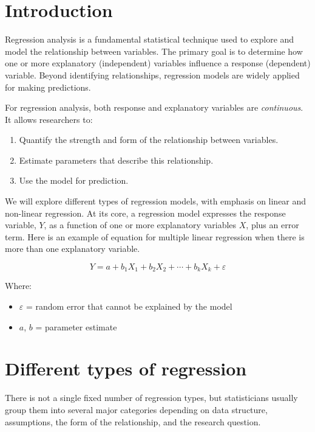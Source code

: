 \documentclass[
]{book}
\providecommand{\tightlist}{%
  \setlength{\itemsep}{0pt}\setlength{\parskip}{0pt}}
\begin{document}
\section{Introduction}\label{introduction-9}

Regression analysis is a fundamental statistical technique used to explore and model the relationship between variables. The primary goal is to determine how one or more explanatory (independent) variables influence a response (dependent) variable. Beyond identifying relationships, regression models are widely applied for making predictions.

For regression analysis, both response and explanatory variables are \emph{continuous}. It allows researchers to:

\begin{enumerate}
\def\labelenumi{\arabic{enumi}.}
\tightlist
\item
  Quantify the strength and form of the relationship between variables.
\item
  Estimate parameters that describe this relationship.
\item
  Use the model for prediction.
\end{enumerate}

We will explore different types of regression models, with emphasis on linear and non-linear regression. At its core, a regression model expresses the response variable, \(Y\), as a function of one or more explanatory variables \(X\), plus an error term. Here is an example of equation for multiple linear regression when there is more than one explanatory variable.

\[Y = a + b_1 X_1 + b_2 X_2 + \cdots + b_k X_k + \varepsilon\]

Where:

\begin{itemize}
\tightlist
\item
  \(\varepsilon\) = random error that cannot be explained by the model
\item
  \(a\), \(b\) = parameter estimate
\end{itemize}

\section{Different types of regression}\label{different-types-of-regression}

There is not a single fixed number of regression types, but statisticians usually group them into several major categories depending on data structure, assumptions, the form of the relationship, and the research question.
\end{document}
